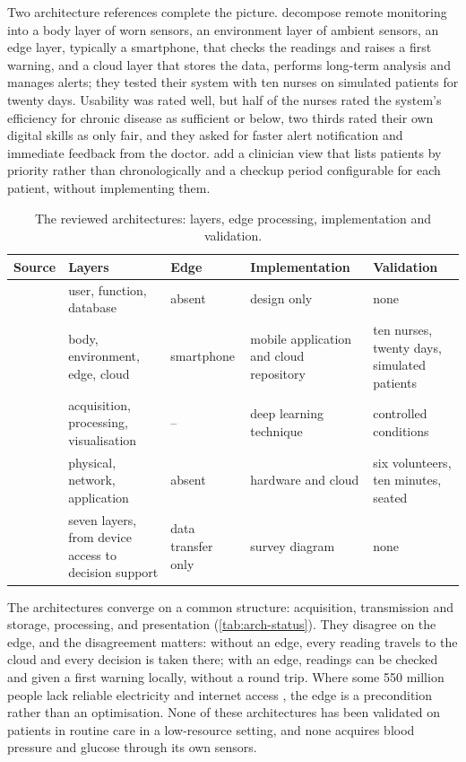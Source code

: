 \documentclass[11pt,a4paper,oneside]{report}
\begin{document}
Two architecture references complete the picture. \Textcite{mucchi2021} decompose remote monitoring into a body layer of worn sensors, an environment layer of ambient sensors, an edge layer, typically a smartphone, that checks the readings and raises a first warning, and a cloud layer that stores the data, performs long-term analysis and manages alerts; they tested their system with ten nurses on simulated patients for twenty days. Usability was rated well, but half of the nurses rated the system's efficiency for chronic disease as sufficient or below, two thirds rated their own digital skills as only fair, and they asked for faster alert notification and immediate feedback from the doctor. \Textcite{yazdani2018} add a clinician view that lists patients by priority rather than chronologically and a checkup period configurable for each patient, without implementing them.

\begin{table}[htbp]
\centering\footnotesize
\caption{The reviewed architectures: layers, edge processing, implementation and validation.}\label{tab:arch-status}\label{tab:layer-mapping}
\begin{tabularx}{\textwidth}{@{}>{\raggedright\arraybackslash}p{2.5cm} >{\raggedright\arraybackslash}X >{\raggedright\arraybackslash}p{2.1cm} >{\raggedright\arraybackslash}p{2.6cm} >{\raggedright\arraybackslash}p{2.9cm}@{}}
\toprule
\textbf{Source} & \textbf{Layers} & \textbf{Edge} & \textbf{Implementation} & \textbf{Validation} \\
\midrule
\textcite{yazdani2018} & user, function, database & absent & design only & none \\
\textcite{mucchi2021} & body, environment, edge, cloud & smartphone & mobile application and cloud repository & ten nurses, twenty days, simulated patients \\
\textcite{tai2024} & acquisition, processing, visualisation & -- & deep learning technique & controlled conditions \\
\textcite{efendi2025} & physical, network, application & absent & hardware and cloud & six volunteers, ten minutes, seated \\
\textcite{liu2025review} & seven layers, from device access to decision support & data transfer only & survey diagram & none \\
\bottomrule
\end{tabularx}
\end{table}

The architectures converge on a common structure: acquisition, transmission and storage, processing, and presentation (\cref{tab:arch-status}). They disagree on the edge, and the disagreement matters: without an edge, every reading travels to the cloud and every decision is taken there; with an edge, readings can be checked and given a first warning locally, without a round trip. Where some 550 million people lack reliable electricity and internet access \parencite{segun2025}, the edge is a precondition rather than an optimisation. None of these architectures has been validated on patients in routine care in a low-resource setting, and none acquires blood pressure and glucose through its own sensors.
\end{document}
